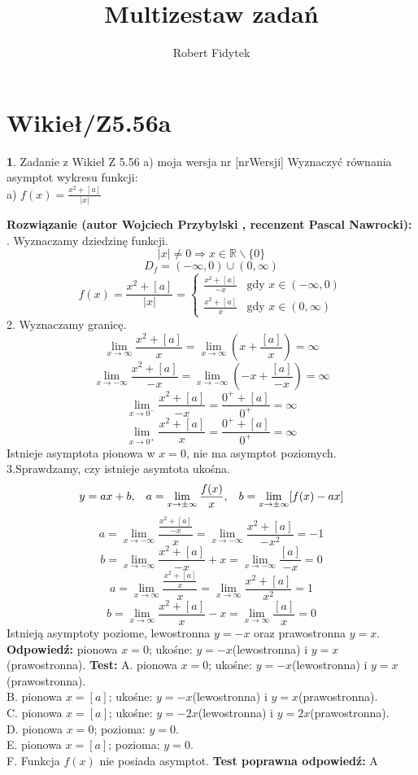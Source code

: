 \documentclass[12pt, a4paper]{article}
\title{Multizestaw zadań}
\author{Robert Fidytek}
\date{}
\theoremstyle{definition} %
\newtheorem{zad}{}
\newcommand{\kategoria}[1]{\section{#1}} %
\newcommand{\zadStart}[1]{\begin{zad}#1\newline} %
\newcommand{\zadStop}{\end{zad}}   %
\newcommand{\rozwStart}[2]{\noindent \textbf{Rozwiązanie (autor #1 , recenzent #2): }\newline} %
\newcommand{\rozwStop}{\newline}                                            %
\newcommand{\odpStart}{\noindent \textbf{Odpowiedź:}\newline}    %
\newcommand{\odpStop}{\newline}                                             %
\newcommand{\testStart}{\noindent \textbf{Test:}\newline} %
\newcommand{\testStop}{\newline} %
\newcommand{\kluczStart}{\noindent \textbf{Test poprawna odpowiedź:}\newline} %
\newcommand{\kluczStop}{\newline} %
\begin{document}
\maketitle


\kategoria{Wikieł/Z5.56a}
\zadStart{Zadanie z Wikieł Z 5.56 a) moja wersja nr [nrWersji]}
Wyznaczyć równania asymptot wykresu funkcji:\\
a) $f(x)=\frac{x^2+[a]}{|x|}$
\zadStop
\rozwStart{Wojciech Przybylski}{Pascal Nawrocki}
1. Wyznaczamy dziedzinę funkcji.
$$|x|\neq0 \Rightarrow x\in\mathbb{R}\backslash\{0\}$$
$$D_{f}=(-\infty,0)\cup(0,\infty)$$
$$
f(x)=\frac{x^2+[a]}{|x|} = \left\{ \begin{array}{ll}
\frac{x^2+[a]}{-x} & \textrm{gdy $x\in(-\infty,0)$}\\
\frac{x^2+[a]}{x} & \textrm{gdy $x\in(0,\infty)$}
\end{array} \right.
$$
2. Wyznaczamy granicę. 
$$\lim_{x\to\infty}\frac{x^2+[a]}{x}=\lim_{x\to\infty}(x+\frac{[a]}{x})=\infty$$
$$\lim_{x\to-\infty}\frac{x^2+[a]}{-x}=\lim_{x\to-\infty}(-x+\frac{[a]}{-x})=\infty$$
$$\lim_{x\to0^{-}}\frac{x^2+[a]}{-x}=\frac{0^{+}+[a]}{0^{+}}=\infty$$
$$\lim_{x\to0^{+}}\frac{x^2+[a]}{x}=\frac{0^{+}+[a]}{0^{+}}=\infty$$
Istnieje asymptota pionowa w $x=0$, nie ma asymptot poziomych.\\
3.Sprawdzamy, czy istnieje asymtota ukośna.
$$y=ax+b,\hspace{3mm}a=\lim_{x\to\pm\infty}\frac{f(x)}{x},\hspace{3mm}b=\lim_{x\to\pm\infty}[f(x)-ax]$$
$$a=\lim_{x\to-\infty}\frac{\frac{x^2+[a]}{-x}}{x}=\lim_{x\to-\infty}\frac{x^2+[a]}{-x^{2}}=-1$$
$$b=\lim_{x\to-\infty}\frac{x^2+[a]}{-x}+x=\lim_{x\to-\infty}\frac{[a]}{-x}=0$$
$$a=\lim_{x\to\infty}\frac{\frac{x^2+[a]}{x}}{x}=\lim_{x\to\infty}\frac{x^2+[a]}{x^{2}}=1$$
$$b=\lim_{x\to\infty}\frac{x^2+[a]}{x}-x=\lim_{x\to\infty}\frac{[a]}{x}=0$$
Istnieją asymptoty poziome, lewostronna $y=-x$ oraz prawostronna $y=x$.
\rozwStop
\odpStart
pionowa $x=0$; ukośne: $y=-x$(lewostronna) i $y=x$(prawostronna).
\odpStop
\testStart
A. pionowa $x=0$; ukośne: $y=-x$(lewostronna) i $y=x$(prawostronna).\\
B. pionowa $x=[a]$; ukośne: $y=-x$(lewostronna) i $y=x$(prawostronna).\\
C. pionowa $x=[a]$; ukośne: $y=-2x$(lewostronna) i $y=2x$(prawostronna).\\
D. pionowa $x=0$; pozioma: $y=0$.\\
E. pionowa $x=[a]$; pozioma: $y=0$.\\
F. Funkcja $f(x)$ nie posiada asymptot.
\testStop
\kluczStart
A
\kluczStop
\end{document}
